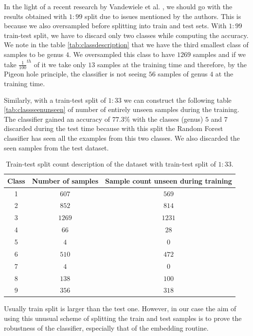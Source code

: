 \documentclass[oneside, twocolumn, a4paper, 10pt]{IEEEtran}
\begin{document}
\par
In the light of a recent research by Vandewiele et al. \cite{23}, we should go with the results obtained with $1:99$ split due to issues mentioned by the authors. This is because we also oversampled before splitting into train and test sets. With $1:99$ train-test split, we have to discard only two classes while computing the accuracy. We note in the table \autoref{tab:classdescription} that we have the third smallest class of samples to be genus $4$. We oversampled this class to have $1269$ samples and if we take $\frac{1}{100}^{th}$ of it we take only $13$ samples at the training time and therefore, by the Pigeon hole principle, the classifier is not seeing $56$ samples of genus $4$ at the training time.\\
\par 
Similarly, with a train-test split of $1:33$ we can construct the following table \autoref{tab:classseenunseen} of number of entirely unseen samples during the training. The classifier gained an accuracy of $77.3$\% with the classes (genus) $5$ and $7$ discarded during the test time because with this split the Random Forest classifier has seen all the examples from this two classes. We also discarded the seen samples from the test dataset.
\begin{table}
\begin{center}
\begin{tabular}{|c|c|c|}
\hline
Class & Number of samples & Sample count unseen during training\\ \hline
1 & $607$ & $569$\\ \hline
2 & $852$ & $814$\\ \hline
3 & $1269$ & $1231$\\ \hline
4 & $66$ & $28$\\ \hline
5 & $4$ & $0$\\ \hline
6 & $510$ & $472$\\ \hline
7 & $4$ & $0$\\ \hline
8 & $138$ & $100$\\ \hline
9 & $356$ & $318$\\ \hline
\end{tabular}
\caption{Train-test split count description of the dataset with train-test split of $1:33$.}
\label{tab:classseenunseen}
\end{center}
\end{table}
Usually train split is larger than the test one. However, in our case the aim of using this unusual scheme of splitting the train and test samples is to prove the robustness of the classifier, especially that of the embedding routine.\\
\end{document}
